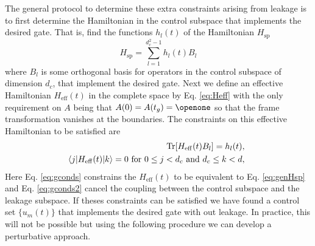 \documentclass[pra,twocolumn,floatfix,superscriptaddress,eqsecnum]{revtex4-1}
\newcommand{\bra}[1]{\langle{#1}|}
\newcommand{\ket}[1]{|{#1}\rangle}
\newcommand{\be}{\begin{equation}}
\newcommand{\ee}{\end{equation}}
\begin{document}
The general protocol to determine these extra constraints arising from leakage is to first determine the Hamiltonian in the control subspace that implements the desired gate. That is, find the functions $h_l(t)$ of the Hamiltonian $H_\mathrm{sp}$
\be \label{eq:genHsp}
H_\mathrm{sp} = \sum_{l=1}^{d_c^2-1} h_l(t)B_l
\ee where $B_l$ is some orthogonal basis for operators in the control subspace of dimension $d_c$, that implement the desired gate. Next we define an effective Hamiltonian $H_\mathrm{eff}(t)$ in the complete space by Eq. \eqref{eq:Heff} with the only requirement on $A$ being that $A(0) = A(t_g) = \openone$ so that the frame transformation vanishes at the boundaries. The constraints on this effective Hamiltonian to be satisfied are
\begin{eqnarray}\label{eq:gconds}
&&\hspace{-5mm}\mathrm{Tr}[ H_\mathrm{eff}(t) B_l]=h_l(t),  \\
&&\hspace{-5mm}\bra{j} H_\mathrm{eff}(t)\ket{k}=0~ \mathrm{for}~0 \leq j < d_c~\mathrm{and}~d_c \leq k < d,\label{eq:gconds2}
\end{eqnarray} Here Eq. \eqref{eq:gconds} constrains the $H_\mathrm{eff}(t)$ to be equivalent to Eq. \eqref{eq:genHsp} and Eq. \eqref{eq:gconds2}  cancel the coupling between the control subspace and the leakage subspace. If theses constraints can be satisfied we have found a control set $\{u_m(t)\}$ that implements the desired gate with out leakage. In practice, this will not be possible but using the following procedure we can develop a perturbative approach.
\end{document}
